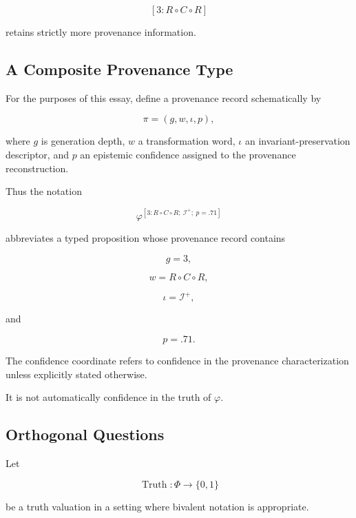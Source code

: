 \documentclass[
  11pt,
  a4paper,
  DIV=12,
  BCOR=0mm,
  parskip=half-
]{scrartcl}
\newcommand{\Truth}{\operatorname{Truth}}
\theoremstyle{definition}
\theoremstyle{plain}
\theoremstyle{remark}
\begin{document}
\[
  [3:R\circ C\circ R]
\]

retains strictly more provenance information.


\subsection{A Composite Provenance Type}
\label{app:composite-provenance}

For the purposes of this essay, define a provenance record schematically by

\[
  \pi
  =
  \left(
    g,
    w,
    \iota,
    p
  \right),
\]

where \(g\) is generation depth, \(w\) a transformation word, \(\iota\) an
invariant-preservation descriptor, and \(p\) an epistemic confidence assigned
to the provenance reconstruction.

Thus the notation

\[
  \varphi^{[3:R\circ C\circ R;\ \mathcal I^+;\ p=.71]}
\]

abbreviates a typed proposition whose provenance record contains

\[
  g=3,
\]

\[
  w=R\circ C\circ R,
\]

\[
  \iota=\mathcal I^+,
\]

and

\[
  p=.71.
\]

The confidence coordinate refers to confidence in the provenance
characterization unless explicitly stated otherwise.

It is not automatically confidence in the truth of \(\varphi\).


\subsection{Orthogonal Questions}
\label{app:truth-provenance}

Let

\[
  \Truth:\Phi\to\{0,1\}
\]

be a truth valuation in a setting where bivalent notation is appropriate.
\end{document}
